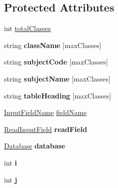 \subsection*{Protected Attributes}
\begin{DoxyCompactItemize}
\item 
int \hyperlink{classClassDetail_a4c3d277d14ead4f704afcbd754b1ebf0}{total\-Classes}
\item 
\hypertarget{classClassDetail_adc76a1aeb9a8f117220a782852c7ecc4}{string {\bfseries class\-Name} \mbox{[}max\-Classes\mbox{]}}\label{classClassDetail_adc76a1aeb9a8f117220a782852c7ecc4}

\item 
\hypertarget{classClassDetail_a354658f5296453f875188e04cdb30039}{string {\bfseries subject\-Code} \mbox{[}max\-Classes\mbox{]}}\label{classClassDetail_a354658f5296453f875188e04cdb30039}

\item 
\hypertarget{classClassDetail_a46738afed3cc58eb02570368a45ed6e5}{string {\bfseries subject\-Name} \mbox{[}max\-Classes\mbox{]}}\label{classClassDetail_a46738afed3cc58eb02570368a45ed6e5}

\item 
\hypertarget{classClassDetail_a72b2e85864fe98d1ddcd0d32e106b884}{string {\bfseries table\-Heading} \mbox{[}max\-Classes\mbox{]}}\label{classClassDetail_a72b2e85864fe98d1ddcd0d32e106b884}

\item 
\hyperlink{classInputFieldName}{Input\-Field\-Name} \hyperlink{classInputDetail_ac6f85380c5152c406d483726382c4798}{field\-Name}
\item 
\hypertarget{classInputDetail_ac0cc70b017ef94fb55acb46fc44f0df5}{\hyperlink{classReadInputField}{Read\-Input\-Field} {\bfseries read\-Field}}\label{classInputDetail_ac0cc70b017ef94fb55acb46fc44f0df5}

\item 
\hypertarget{classInputDetail_a479cd6c13833bd5de6e5630078c961b6}{\hyperlink{classDatabase}{Database} {\bfseries database}}\label{classInputDetail_a479cd6c13833bd5de6e5630078c961b6}

\item 
\hypertarget{classInputDetail_a2e9226db1b744de4bf406398f48cf962}{int {\bfseries i}}\label{classInputDetail_a2e9226db1b744de4bf406398f48cf962}

\item 
\hypertarget{classInputDetail_af124a26cb4e4f86d0d9eb68200ee500b}{int {\bfseries j}}\label{classInputDetail_af124a26cb4e4f86d0d9eb68200ee500b}


\end{DoxyCompactItemize}
